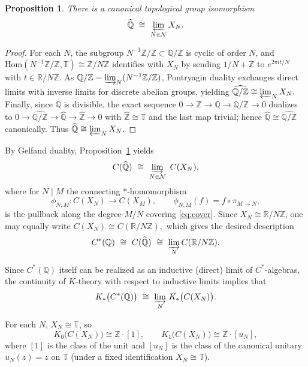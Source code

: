 \documentclass[11pt]{article}
\newtheorem{proposition}[theorem]{Proposition}  %
\newcommand{\Z}{\mathbb{Z}}
\newcommand{\Q}{\mathbb{Q}}
\newcommand{\R}{\mathbb{R}}
\newcommand{\T}{\mathbb{T}}
\newcommand{\cstar}{C^{*}}
\newcommand{\what}[1]{\widehat{#1}}
\newcommand{\Hom}{\mathrm{Hom}}
\theoremstyle{remark}
\begin{document}
\begin{proposition}\label{prop:dual-as-solenoid}
There is a canonical topological group isomorphism
\[
\what{\Q}\ \cong\ \varprojlim_{N\in\mathcal{N}} X_{N}.
\]
\end{proposition}

\begin{proof}
For each $N$, the subgroup $N^{-1}\Z/\Z\subset \Q/\Z$ is cyclic of order $N$, and $\Hom(N^{-1}\Z/\Z,\T)\cong \Z/N\Z$ identifies with $X_{N}$ by sending $1/N+\Z$ to $e^{2\pi i t/N}$ with $t\in \R/N\Z$. As $\Q/\Z=\varinjlim_{N} (N^{-1}\Z/\Z)$, Pontryagin duality exchanges direct limits with inverse limits for discrete abelian groups, yielding
\(
\what{\Q/\Z}\cong \varprojlim_{N} X_{N}.
\)
Finally, since $\Q$ is divisible, the exact sequence $0\to \Z\to \Q\to \Q/\Z\to 0$ dualizes to $0\to \what{\Q/\Z}\to \what{\Q}\to \what{\Z}\to 0$ with $\what{\Z}\cong \T$ and the last map trivial; hence $\what{\Q}\cong \what{\Q/\Z}$ canonically. Thus $\what{\Q}\cong \varprojlim_{N} X_{N}$.
\end{proof}

By Gelfand duality, Proposition~\ref{prop:dual-as-solenoid} yields
\begin{equation}\label{eq:direct-limit-algebra}
C(\what{\Q})\ \cong\ \varinjlim_{N\in\mathcal{N}}\ C(X_{N}),
\end{equation}
where for $N\mid M$ the connecting $*$-homomorphism
\begin{equation}\label{eq:connecting-map}
\phi_{N,M}: C(X_{N})\longrightarrow C(X_{M}),\qquad \phi_{N,M}(f)=f\circ \pi_{M\to N},
\end{equation}
is the pullback along the degree-$M/N$ covering \eqref{eq:cover}. Since $X_{N}\cong \R/N\Z$, one may equally write
\(
C(X_{N})\cong C(\R/N\Z),
\)
which gives the desired description
\begin{equation}\label{eq:cstarQ-as-limit}
\cstar(\Q)\ \cong\ C(\what{\Q})\ \cong\ \varinjlim_{N} C(\R/N\Z).
\end{equation}

Since $C^*(\mathbb{Q})$ itself can be realized as an inductive (direct) limit of $C^*$-algebras, 
the continuity of $K$-theory with respect to inductive limits \cite[Ch.~6]{rordam} 
implies that
\[
K_{*}\big(\cstar(\Q)\big)\ \cong\ \varinjlim_{N}\, K_{*}\big(C(X_{N})\big).
\]

For each $N$, $X_{N}\cong \T$, so
\[
K_{0}\big(C(X_{N})\big)\cong \Z\cdot[1],\qquad
K_{1}\big(C(X_{N})\big)\cong \Z\cdot[u_N],
\]
where $[1]$ is the class of the unit and $[u_N]$ is the class of the canonical unitary $u_N(z)=z$ on $\T$ (under a fixed identification $X_{N}\cong \T$).
\end{document}
